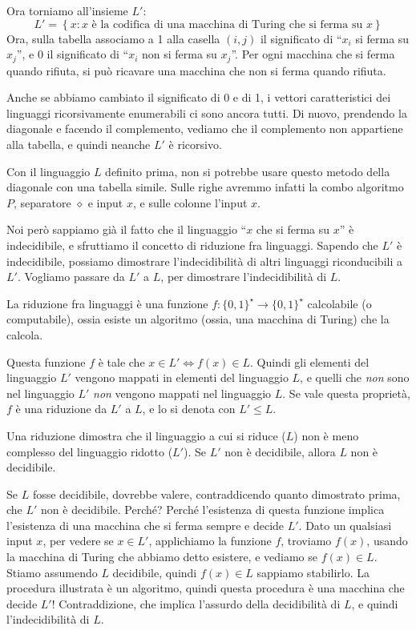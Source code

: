Ora torniamo all'insieme $L'$:
\[
L' = \left\{ x : x \text{ \`e la codifica di una macchina di Turing che si ferma su } x \right\}
\]
Ora, sulla tabella associamo a 1 alla casella $(i,j)$ il significato di ``$x_i$ si ferma su $x_j$'', e 0 il significato di ``$x_i$ non si ferma su $x_j$''. Per ogni macchina che si ferma quando rifiuta, si pu\`o ricavare una macchina che non si ferma quando rifiuta.

Anche se abbiamo cambiato il significato di 0 e di 1, i vettori caratteristici dei linguaggi ricorsivamente enumerabili ci sono ancora tutti. Di nuovo, prendendo la diagonale e facendo il complemento, vediamo che il complemento non appartiene alla tabella, e quindi neanche $L'$ \`e ricorsivo.

Con il linguaggio $L$ definito prima, non si potrebbe usare questo metodo della diagonale con una tabella simile. Sulle righe avremmo infatti la combo algoritmo $P$, separatore $\diamond$ e input $x$, e sulle colonne l'input $x$.

Noi per\`o sappiamo gi\`a il fatto che il linguaggio ``$x$ che si ferma su $x$'' \`e indecidibile, e sfruttiamo il concetto di riduzione fra linguaggi. Sapendo che $L'$ \`e indecidibile, possiamo dimostrare l'indecidibilit\`a di altri linguaggi riconducibili a $L'$. Vogliamo passare da $L'$ a $L$, per dimostrare l'indecidibilit\`a di $L$.

\begin{defn}
La riduzione fra linguaggi \`e una funzione $f : \{0,1\}^{\star} \to \{0,1\}^{\star}$ calcolabile (o computabile), ossia esiste un algoritmo (ossia, una macchina di Turing) che la calcola.
\end{defn}
Questa funzione $f$ \`e tale che $x \in L' \iff f(x) \in L$. Quindi gli elementi del linguaggio $L'$ vengono mappati in elementi del linguaggio $L$, e quelli che \emph{non} sono nel linguaggio $L'$ \emph{non} vengono mappati nel linguaggio $L$. Se vale questa propriet\`a, $f$ \`e una riduzione da $L'$ a $L$, e lo si denota con $L' \le L$.

Una riduzione dimostra che il linguaggio a cui si riduce ($L$) non \`e meno complesso del linguaggio ridotto ($L'$). Se $L'$ non \`e decidibile, allora $L$ non \`e decidibile.

Se $L$ fosse decidibile, dovrebbe valere, contraddicendo quanto dimostrato prima, che $L'$ non \`e decidibile. Perch\'e? Perch\'e l'esistenza di questa funzione implica l'esistenza di una macchina che si ferma sempre e decide $L'$. Dato un qualsiasi input $x$, per vedere se $x \in L'$, applichiamo la funzione $f$, troviamo $f(x)$, usando la macchina di Turing che abbiamo detto esistere, e vediamo se $f(x) \in L$. Stiamo assumendo $L$ decidibile, quindi $f(x) \in L$ sappiamo stabilirlo. La procedura illustrata \`e un algoritmo, quindi questa procedura \`e una macchina che decide $L'$! Contraddizione, che implica l'assurdo della decidibilit\`a di $L$, e quindi l'indecidibilit\`a di $L$.

